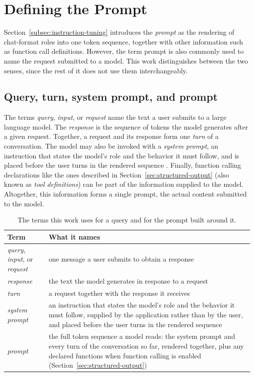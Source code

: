 \section{Defining the Prompt}
\label{sec:terminology}

Section~\ref{subsec:instruction-tuning} introduces the \emph{prompt} as the rendering of chat-format roles into one token sequence, together with other information such as function call definitions. However, the term prompt is also commonly used to name the request submitted to a model. This work distinguishes between the two senses, since the rest of it does not use them interchangeably.

\subsection{Query, turn, system prompt, and prompt}
\label{subsec:query-prompt}

The terms \emph{query}, \emph{input}, or \emph{request} name the text a user submits to a large language model. The \emph{response} is the sequence of tokens the model generates after a given request. Together, a request and its response form one \emph{turn} of a conversation. The model may also be invoked with a \emph{system prompt}, an instruction that states the model's role and the behavior it must follow, and is placed before the user turns in the rendered sequence \cite{openaiGptoss120bGptoss20bModel2025}. Finally, function calling declarations like the ones described in Section~\ref{sec:structured-output} (also known as \emph{tool definitions}) can be part of the information supplied to the model. Altogether, this information forms a single prompt, the actual content submitted to the model.

\begin{table}[htbp]
\centering
\begin{tabularx}{\textwidth}{@{}>{\raggedright\arraybackslash}p{}X@{}}
\toprule
\textbf{Term} & \textbf{What it names} \\
\midrule
\emph{query}, \emph{input}, or \emph{request} & one message a user submits to obtain a response \\[4pt]
\emph{response} & the text the model generates in response to a request \\[4pt]
\emph{turn} & a request together with the response it receives \\[4pt]
\emph{system prompt} & an instruction that states the model's role and the behavior it must follow, supplied by the application rather than by the user, and placed before the user turns in the rendered sequence \cite{openaiGptoss120bGptoss20bModel2025} \\[4pt]
\emph{prompt} & the full token sequence a model reads: the system prompt and every turn of the conversation so far, rendered together, plus any declared functions when function calling is enabled (Section~\ref{sec:structured-output}) \\
\bottomrule
\end{tabularx}
\caption[Terms for a query and its surrounding prompt]{The terms this work uses for a query and for the prompt built around it.}
\label{tab:terminology}
\end{table}


